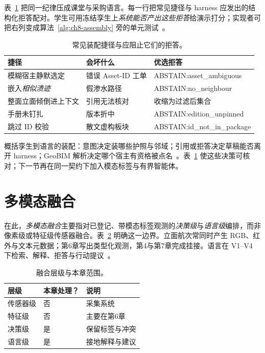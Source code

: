 表~\ref{tab:ch8-assembly-fail} 把同一纪律压成课堂与采购语言。每一行把常见捷径与 harness 应发出的结构化拒答配对。学生可用冻结孪生上\emph{系统能否产出这些拒答}给演示打分；实现者可把右列变成算法~\ref{alg:ch8-assembly} 旁的单元测试~\cite{ji2023,peng2024,liang2023helm}。

\begin{table}[htbp]
\centering
\caption{常见装配捷径与应阻止它们的拒答。}
\label{tab:ch8-assembly-fail}
\begin{tabular}{llp{4.4cm}}
\toprule
捷径 & 会坏什么 & 优选拒答 \\
\midrule
模糊宿主静默选定 & 错误 Asset-ID 工单 & ABSTAIN:asset\_ambiguous \\
嵌入\emph{相似渍迹} & 假渗水路径 & ABSTAIN:no\_neighbour \\
整面立面倾倒进上下文 & 引用无法核对 & 收缩为过滤后集合 \\
手册未钉扎 & 版本折中 & ABSTAIN:edition\_unpinned \\
跳过 ID 校验 & 散文虚构板块 & ABSTAIN:id\_not\_in\_package \\
\bottomrule
\end{tabular}
\end{table}

概括孪生到语言的装配：意图决定装哪些护照与邻域；引用或拒答决定草稿能否离开 harness；GeoBIM 解析决定哪个宿主有资格被点名~\cite{lewis2020,peng2024,zhang2025}。表~\ref{tab:ch8-assembly-fail} 使这些决策可核对；下一节再在同一契约下加入模态标签与有界智能体。

\section{多模态融合}
\label{sec:ch8-multimodal}

在此，\emph{多模态融合}主要指对已登记、带模态标签观测的\emph{决策级}与\emph{语言级}编排，而非像素级或特征级传感器融合。表~\ref{tab:ch8-fusion-levels} 明确这一边界。立面航次常同时产生 RGB、红外与文本元数据；第6章写出类型化观测，第4与第7章完成挂接。语言在 V1--V4 下检索、解释、拒答与行动提议~\cite{zhao2024facade,zhao2026physical}。

\begin{table}[htbp]
\centering
\caption{融合层级与本章范围。}
\label{tab:ch8-fusion-levels}
\begin{tabular}{llp{4.8cm}}
\toprule
层级 & 本章处理？ & 说明 \\
\midrule
传感器级 & 否 & 采集系统 \\
特征级 & 否 & 主要在第6章 \\
决策级 & 是 & 保留标签与冲突 \\
语言级 & 是 & 接地解释与建议 \\
\bottomrule
\end{tabular}
\end{table}

